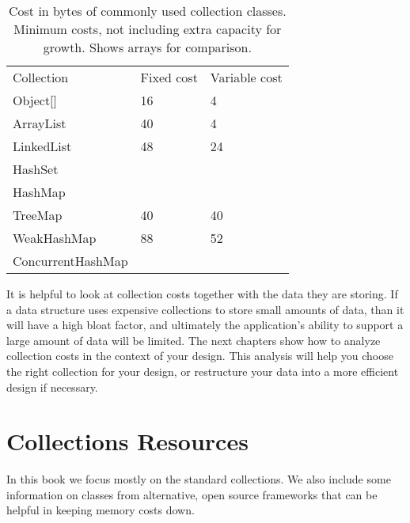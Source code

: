 \begin{table}
\centering
	\begin{tabular}{lll}
	\toprule
	   Collection & Fixed cost & Variable cost
	\\ \cmidrule(r){1-1} \cmidrule(l){2-2}
	   \cmidrule(l){3-3}
	Object[] & 16 & 4
	\\
	ArrayList & 40 & 4
	\\
	LinkedList & 48 & 24
	\\
	HashSet &  & 
	\\
	HashMap & &
	\\
	TreeMap & 40 & 40
	\\
	WeakHashMap & 88 & 52
	\\
	ConcurrentHashMap &  &
	\\
	\bottomrule
	\end{tabular}
	\caption{Cost in bytes of commonly used collection classes. Minimum costs, not
	including extra capacity for growth. Shows arrays for comparison.}
	\label{tab:collections-fixed-and-variable}
\end{table}

It is helpful to look at collection costs 
together with the data they are storing. If a data structure uses expensive collections
to store small amounts of data, than it
will have a high bloat factor, and ultimately the application's ability to
support a large amount of data will be limited. The next chapters show
how to analyze collection costs in the context of your design.
This analysis will help you choose the right collection for your design, or
restructure your data into a more efficient design if necessary.


\section{Collections Resources}


In this book we focus
mostly on the standard collections. We also include some information on classes
from alternative, open source frameworks that can be helpful in keeping
memory costs down.

